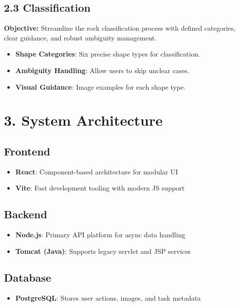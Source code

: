 \documentclass[12pt]{article}
\begin{document}
\subsection*{2.3 Classification}
\textbf{Objective:} Streamline the rock classification process with defined categories, clear guidance, and robust ambiguity management.
\begin{itemize}
  \item \textbf{Shape Categories}: Six precise shape types for classification.
  \item \textbf{Ambiguity Handling}: Allow users to skip unclear cases.
  \item \textbf{Visual Guidance}: Image examples for each shape type.
\end{itemize}

\section*{3. System Architecture}
\subsection*{Frontend}
\begin{itemize}
  \item \textbf{React}: Component-based architecture for modular UI
  \item \textbf{Vite}: Fast development tooling with modern JS support
\end{itemize}

\subsection*{Backend}
\begin{itemize}
  \item \textbf{Node.js}: Primary API platform for async data handling
  \item \textbf{Tomcat (Java)}: Supports legacy servlet and JSP services
\end{itemize}

\subsection*{Database}
\begin{itemize}
  \item \textbf{PostgreSQL}: Stores user actions, images, and task metadata
\end{itemize}
\end{document}
